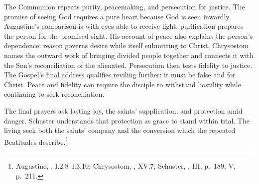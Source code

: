 The Communion repeats purity, peacemaking, and persecution for justice.
The promise of seeing God requires a pure heart because God is seen
inwardly. Augustine's comparison is with eyes able to receive light;
purification prepares the person for the promised sight. His account of
peace also explains the person's dependence: reason governs desire while
itself submitting to Christ. Chrysostom names the outward work of bringing
divided people together and connects it with the Son's reconciliation
of the alienated. Persecution then tests fidelity to justice. The Gospel's
final address qualifies reviling further: it must be false and for Christ.
Peace and fidelity can require the disciple to withstand hostility while
continuing to seek reconciliation.

The final prayers ask lasting joy, the saints' supplication,
and protection amid danger. Schuster understands that protection as grace
to stand within trial. The living seek both the saints' company and the
conversion which the repeated Beatitudes describe.\footnote{Augustine,
, I.2.8--I.3.10; Chrysostom,
, XV.7; Schuster, , III,
p.~189; V, p.~211.}
\clearpage

